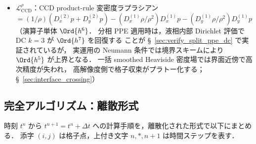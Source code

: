 \begin{tcolorbox}[defbox, title={本章で用いる離散演算子の記法}]
\begin{itemize}[noitemsep]
\[              \right]
          \]
          $J_f = 1/d_f^{(i)}$ を使い $\mathcal{D}_\text{FVM}(\mathcal{G}^\text{adj}) = \mathcal{L}_\text{FVM}$ を保証する
          （§~\ref{sec:fvm_ccd_corrector}；均一格子では $\mathcal{G}^\text{adj} = D^{(1)}_\text{CCD}$）．
  \item $\mathcal{L}_{\mathrm{CCD}}^{\rho}$：CCD product-rule 変密度ラプラシアン
          $= (1/\rho)(D_x^{(2)}p + D_y^{(2)}p)
            - (D_x^{(1)}\rho/\rho^2)D_x^{(1)}p
            - (D_y^{(1)}\rho/\rho^2)D_y^{(1)}p$
          （演算子単体 $\Ord{h^6}$．
          分相 PPE 適用時は，液相内部 Dirichlet 評価で DC $k{=}3$ が $\Ord{h^7}$ を回復する
          ことが §~\ref{sec:verify_split_ppe_dc} で実証されているが，
          実運用の Neumann 条件では境界スキームにより $\Ord{h^5}$ が上界となる．
          一括 smoothed Heaviside 密度場では界面近傍で高次精度が失われ，
          高解像度側で格子収束がプラトー化する；§~\ref{sec:interface_crossing}）
\end{itemize}
\end{tcolorbox}

\subsection{完全アルゴリズム：離散形式}
\label{sec:algo_flow}

時刻 $t^n$ から $t^{n+1} = t^n + \Delta t$ への計算手順を，離散化された形式で以下にまとめる．
添字 $(i,j)$ は格子点，上付き文字 $n, *, n+1$ は時間ステップを表す．

